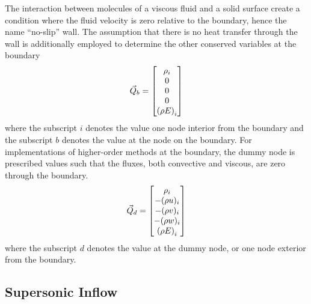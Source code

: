 The interaction between molecules of a viscous fluid and a solid surface create a condition where the fluid velocity is zero relative to the boundary, hence the name \enquote{no-slip} wall. The assumption that there is no heat transfer through the wall is additionally employed to determine the other conserved variables at the boundary
%
%
%
\begin{equation}
\vec{Q}_b = \begin{bmatrix} \rho_i \\
  0 \\
  0 \\
  0 \\
  \qty(\rho E)_i \end{bmatrix}
\end{equation}
%
where the subscript $i$ denotes the value one node interior from the boundary and the subscript $b$ denotes the value at the node on the boundary. For implementations of higher-order methods at the boundary, the dummy node is prescribed values such that the fluxes, both convective and viscous, are zero through the boundary.
%
\begin{equation}
\vec{Q}_d = \begin{bmatrix} \rho_i \\
  -(\rho u)_i \\
  -(\rho v)_i \\
  -(\rho w)_i \\
  \qty(\rho E)_i \end{bmatrix}
\end{equation}
%
where the subscript $d$ denotes the value at the dummy node, or one node exterior from the boundary.

\subsection{Supersonic Inflow}

